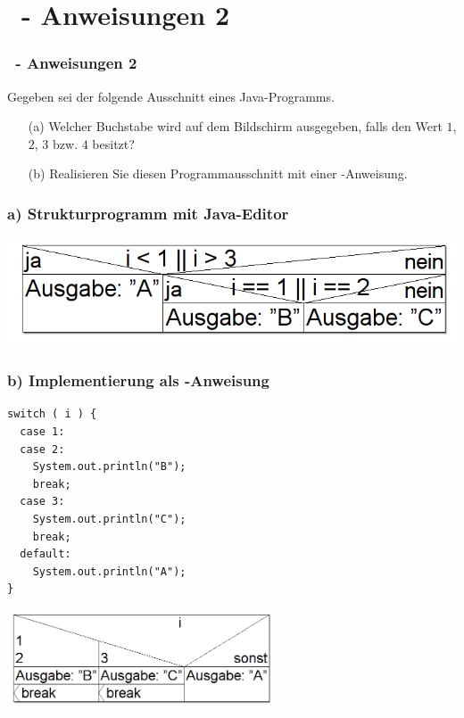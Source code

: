 \def\stitle{\theexercise\ - Anweisungen 2}
\section{\stitle}
\begin{frame}[t]%
    \frametitle{\stitle}
\medskip

Gegeben sei der folgende Ausschnitt eines Java-Programms.


\begin{itemize}
\item[(a)] Welcher Buchstabe wird auf dem Bildschirm ausgegeben, falls  den Wert $1$, $2$, $3$ bzw. $4$ besitzt?
\item[(b)] Realisieren Sie diesen Programmausschnitt mit einer -Anweisung.
\end{itemize}
\end{frame}


\begin{frame}[fragile]%
 \frametitle{a) Strukturprogramm mit Java-Editor}%

\begin{center}

\includegraphics[width=1\textwidth]{anweis-2/Bilder/Struktogramm_a}
\end{center}
\end{frame}


\begin{frame}[fragile]%
 \frametitle{b) Implementierung als -Anweisung}%

\begin{center}
\begin{minipage}{0.7\textwidth}
\begin{lstlisting}[style=JAVA]
switch ( i ) {
  case 1:
  case 2:
    System.out.println("B");
    break;
  case 3:
    System.out.println("C");
    break;
  default:
    System.out.println("A");
}
\end{lstlisting}

\end{minipage}

\includegraphics[width=0.6\textwidth]{anweis-2/Bilder/Struktogramm_b}
\end{center}

\end{frame}
